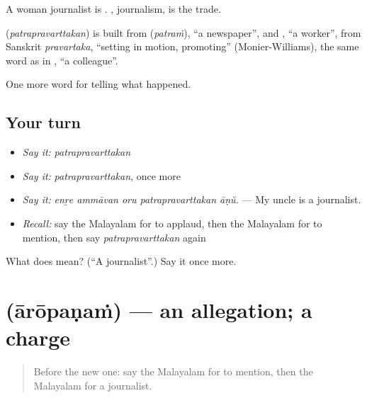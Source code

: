 A woman journalist is . , journalism, is the trade.

\begin{cousinweb}
\textbf{} (\emph{patrapravarttakan}) is built from  (\emph{patraṁ}), \textquotedblleft{}a newspaper\textquotedblright{}, and , \textquotedblleft{}a worker\textquotedblright{}, from Sanskrit \emph{pravartaka}, \textquotedblleft{}setting in motion, promoting\textquotedblright{} (Monier-Williams), the same word as in , \textquotedblleft{}a colleague\textquotedblright{}.
\end{cousinweb}

\begin{grammarlens}[title={What you've built}]
One more word for telling what happened.
\end{grammarlens}

\subsection*{Your turn}
\begin{itemize}
\raggedright
  \item \emph{Say it:} \emph{patrapravarttakan}
  \item \emph{Say it:} \emph{patrapravarttakan}, once more
  \item \emph{Say it:} \emph{enṟe ammāvan oru patrapravarttakan āṇŭ.} — My uncle is a journalist.
  \item \emph{Recall:} say the Malayalam for to applaud, then the Malayalam for to mention, then say \emph{patrapravarttakan} again
\end{itemize}

\begin{tcolorbox}[breakable,colback=teal!4,colframe=teal!35!black,title={Before you move on}]
What does  mean? (\textquotedblleft{}A journalist\textquotedblright{}.) Say it once more.
\end{tcolorbox}
\section[\texorpdfstring{\ml{ആരോപണം} (ārōpaṇaṁ)}{ആരോപണം (ārōpaṇaṁ)}]{ (ārōpaṇaṁ) — an allegation; a charge}

\label{lesson:ML-C355-aropanam}



\begin{quote}
Before the new one: say the Malayalam for to mention, then the Malayalam for a journalist.
\end{quote}

